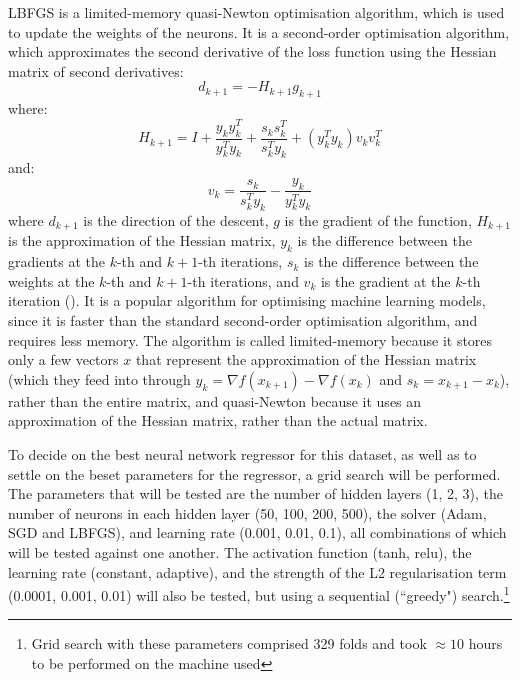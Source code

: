 \documentclass[12pt]{report}
\begin{document}
LBFGS is a limited-memory quasi-Newton optimisation algorithm, which is used to update the weights of the neurons. It is a second-order optimisation algorithm, which approximates the second derivative of the loss function using the Hessian matrix of second derivatives:
\begin{equation}
	d_{k+1} = -H_{k+1}g_{k+1}
\end{equation}
where:
\begin{equation}
	H_{k+1} = I + \frac{y_k y_k^T}{y_k^Ty_k} + \frac{s_k s_k^T}{s_k^Ty_k}+(y_k^Ty_k)v_k v_k^T
\end{equation}
and:
\begin{equation}
	v_k = \frac{s_k}{s_k^Ty_k}-\frac{y_k}{y_k^Ty_k}
\end{equation}
where $d_{k+1}$ is the direction of the descent, $g$ is the gradient of the function, $H_{k+1}$ is the approximation of the Hessian matrix, $y_k$ is the difference between the gradients at the $k$-th and $k+1$-th iterations, $s_k$ is the difference between the weights at the $k$-th and $k+1$-th iterations, and $v_k$ is the gradient at the $k$-th iteration (\cite[p. 181]{pytlak2009}).
It is a popular algorithm for optimising machine learning models, since it is faster than the standard second-order optimisation algorithm, and requires less memory. The algorithm is called limited-memory because it stores only a few vectors $x$ that represent the approximation of the Hessian matrix (which they feed into through $y_k = \nabla f(x_{k+1})-\nabla f(x_k)$ and $s_k = x_{k+1}-x_k$), rather than the entire matrix, and quasi-Newton because it uses an approximation of the Hessian matrix, rather than the actual matrix.

To decide on the best neural network regressor for this dataset, as well as to settle on the beset parameters for the regressor, a grid search will be performed. The parameters that will be tested are the number of hidden layers (1, 2, 3), the number of neurons in each hidden layer (50, 100, 200, 500), the solver (Adam, SGD and LBFGS), and learning rate (0.001, 0.01, 0.1), all combinations of which will be tested against one another. The activation function (tanh, relu), the learning rate (constant, adaptive), and the strength of the L2 regularisation term (0.0001, 0.001, 0.01) will also be tested, but using a sequential (``greedy") search.\footnote{Grid search with these parameters comprised 329 folds and took $\approx10$ hours to be performed on the machine used}
\end{document}
